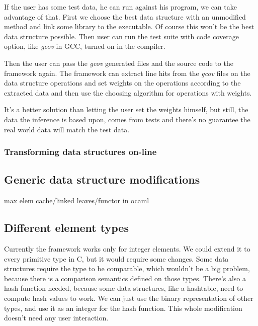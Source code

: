 \documentclass[11pt]{article}
\begin{document}
			If the user has some test data, he can run against his program, we can take advantage of that.
			First we choose the best data structure with an unmodified method and link some library to the
			executable. Of course this won't be the best data structure possible. Then user can run the test
			suite with code coverage option, like \emph{gcov} in GCC, turned on in the compiler.



			Then the user can pass the \emph{gcov} generated files and the source code to the framework
			again. The framework can extract line hits from the \emph{gcov} files on the data structure
			operations and set weights on the operations according to the extracted data and then use the
			choosing algorithm for operations with weights.

			It's a better solution than letting the user set the weights himself, but still, the data the
			inference is based upon, comes from tests and there's no guarantee the real world data will
			match the test data.

		\subsubsection{Transforming data structures on-line} \label{sec:transforming-on-line}

	\subsection{Generic data structure modifications}

		max elem cache/linked leaves/functor in ocaml

	\subsection{Different element types}

		Currently the framework works only for integer elements. We could extend it to every primitive type in
		C, but it would require some changes.  Some data structures require the type to be comparable, which
		wouldn't be a big problem, because there is a comparison semantics defined on those types. There's also
		a hash function needed, because some data structures, like a hashtable, need to compute hash values to
		work. We can just use the binary representation of other types, and use it as an integer for the hash
		function. This whole modification doesn't need any user interaction.
\end{document}

